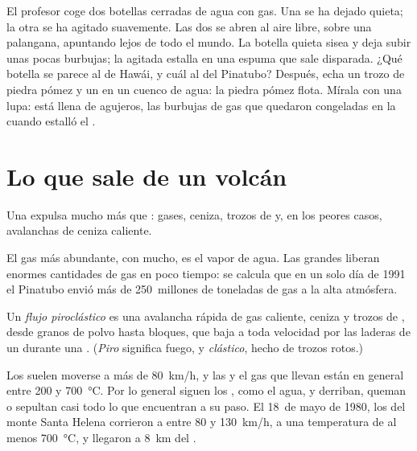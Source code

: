 \begin{inthelab}
El profesor coge dos botellas cerradas de agua con gas. Una se ha dejado
quieta; la otra se ha agitado suavemente. Las dos se abren al aire libre,
sobre una palangana, apuntando lejos de todo el mundo. La botella quieta
sisea y deja subir unas pocas burbujas; la agitada estalla en una espuma
que sale disparada. ¿Qué botella se parece al  de Hawái, y cuál al del
Pinatubo? Después, echa un trozo de piedra pómez y un  en un
cuenco de agua: la piedra pómez flota. Mírala con una lupa: está llena de
agujeros, las burbujas de gas que quedaron congeladas en la  cuando
estalló el .
\end{inthelab}

\section{Lo que sale de un volcán}

Una  expulsa mucho más que : gases, ceniza, trozos de  y,
en los peores casos, avalanchas de ceniza caliente.

El gas más abundante, con mucho, es el vapor de agua. Las grandes
 liberan enormes cantidades de gas en poco tiempo: se calcula que
en un solo día de 1991 el Pinatubo envió más de 250~millones de toneladas de
gas a la alta atmósfera.

\begin{definition}\label{def:g7:volcanoes:pyroclastic-flow}
Un \emph{flujo piroclástico}
es una avalancha rápida de gas caliente, ceniza y trozos de , desde
granos de polvo hasta bloques, que baja a toda velocidad por las laderas de
un  durante una . (\emph{Piro} significa fuego, y
\emph{clástico}, hecho de trozos rotos.)
\end{definition}

Los  suelen moverse a más de \qty{80}{km/h}, y las 
y el gas que llevan están en general entre 200 y \qty{700}{\degreeCelsius}.
Por lo general siguen los , como el agua, y derriban, queman o
sepultan casi todo lo que encuentran a su paso. El 18~de mayo de 1980, los  del monte
Santa Helena corrieron a entre 80 y \qty{130}{km/h}, a una temperatura de al
menos \qty{700}{\degreeCelsius}, y llegaron a \qty{8}{km} del .

